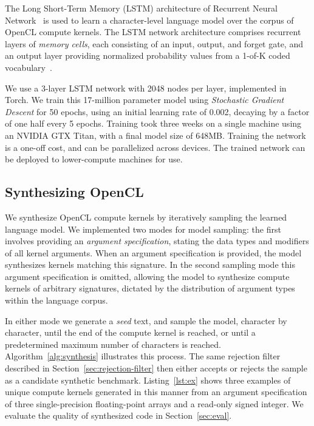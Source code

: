 The Long Short-Term Memory (LSTM) architecture of Recurrent Neural Network~\cite{Sundermeyer2012,Mikolov2015} is used to learn a character-level language model over the corpus of OpenCL compute kernels. The LSTM network architecture comprises recurrent layers of \emph{memory cells}, each consisting of an input, output, and forget gate, and an output layer providing normalized probability values from a 1-of-K coded vocabulary~\cite{Graves}.

We use a 3-layer LSTM network with 2048 nodes per layer, implemented in Torch. We train this 17-million parameter model using \textit{Stochastic Gradient Descent} for 50 epochs, using an initial learning rate of 0.002, decaying by a factor of one half every 5 epochs. Training took three weeks on a single machine using an NVIDIA GTX Titan, with a final model size of 648MB. Training the network is a one-off cost, and can be parallelized across devices. The trained network can be deployed to lower-compute machines for use.

\subsection{Synthesizing OpenCL}

We synthesize OpenCL compute kernels by iteratively sampling the learned language model. We implemented two modes for model sampling: the first involves providing an \emph{argument specification}, stating the data types and modifiers of all kernel arguments. When an argument specification is provided, the model synthesizes kernels matching this signature. In the second sampling mode this argument specification is omitted, allowing the model to synthesize compute kernels of arbitrary signatures, dictated by the distribution of argument types within the language corpus.

In either mode we generate a \emph{seed} text, and sample the model, character by character, until the end of the compute kernel is reached, or until a predetermined maximum number of characters is reached. Algorithm~\ref{alg:synthesis} illustrates this process. The same rejection filter described in Section~\ref{sec:rejection-filter} then either accepts or rejects the sample as a candidate synthetic benchmark. Listing~\ref{lst:ex} shows three examples of unique compute kernels generated in this manner from an argument specification of three single-precision floating-point arrays and a read-only signed integer. We evaluate the quality of synthesized code in Section~\ref{sec:eval}.

